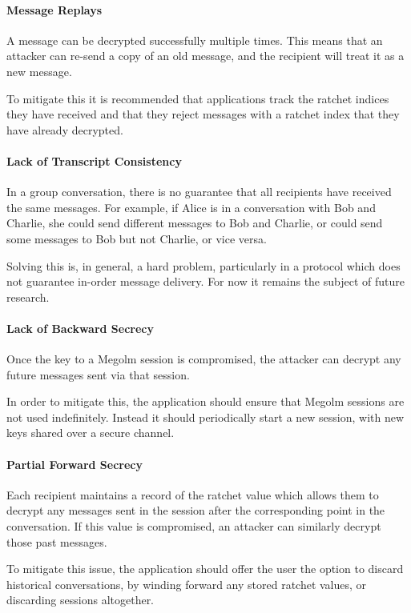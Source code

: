 \paragraph{Message Replays}
A message can be decrypted successfully multiple times. This means that an attacker can re-send a copy of an old message, and the recipient will treat it as a new message.

To mitigate this it is recommended that applications track the ratchet indices they have received and that they reject messages with a ratchet index that they have already decrypted.

\paragraph{Lack of Transcript Consistency}
In a group conversation, there is no guarantee that all recipients have received the same messages. For example, if Alice is in a conversation with Bob and Charlie, she could send different messages to Bob and Charlie, or could send some messages to Bob but not Charlie, or vice versa.

Solving this is, in general, a hard problem, particularly in a protocol which does not guarantee in-order message delivery. For now it remains the subject of future research.

\paragraph{Lack of Backward Secrecy}
Once the key to a Megolm session is compromised, the attacker can decrypt any future messages sent via that session.

In order to mitigate this, the application should ensure that Megolm sessions are not used indefinitely. Instead it should periodically start a new session, with new keys shared over a secure channel.

\paragraph{Partial Forward Secrecy}
Each recipient maintains a record of the ratchet value which allows them to decrypt any messages sent in the session after the corresponding point in the conversation. If this value is compromised, an attacker can similarly decrypt those past messages.

To mitigate this issue, the application should offer the user the option to discard historical conversations, by winding forward any stored ratchet values, or discarding sessions altogether.

